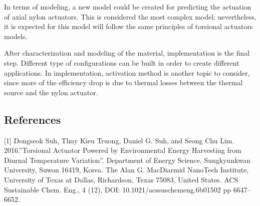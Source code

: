 \documentclass[12pt,oneside]{article}
\begin{document}
	In terms of modeling, a new model could be created for predicting the actuation of axial nylon actuators. This is considered the most complex model; nevertheless, it is expected for this model will follow the same principles of torsional actuators models.\par 

	After characterization and modeling of the material, implementation is the final step. Different type of configurations can be built in order to create different applications. In implementation, activation method is another topic to consider, since more of the efficiency drop is due to thermal losses between the thermal source and the nylon actuator. 



\subsection*{References}

\hspace{.5cm}
 [1] Dongseok Suh, Thuy Kieu Truong, Daniel G. Suh,  and Seong Chu Lim. 2016.”Torsional Actuator Powered by Environmental Energy Harvesting from Diurnal Temperature Variation”. Department of Energy Science, Sungkyunkwan University, Suwon 16419, Korea. The Alan G. MacDiarmid NanoTech Institute, University of Texas at Dallas, Richardson, Texas 75083, United States. ACS Sustainable Chem. Eng., 4 (12), DOI: 10.1021/acssuschemeng.6b01502 pp 6647–6652. \par
\vspace{0.4cm}
\end{document}
